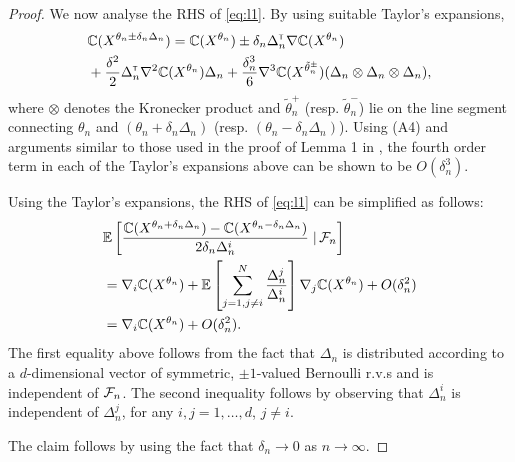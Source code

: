 \begin{proof}
We now analyse the RHS of \eqref{eq:l1}.
By using suitable Taylor's expansions,
\begin{align*}
&\mathbb{C}(X^{\theta_n \pm \delta_n \Delta_n}) = \mathbb{C}(X^{\theta_n}) \pm \delta_n \Delta_n^\mathsf{\scriptscriptstyle T} \nabla \mathbb{C}(X^{\theta_n}) \\
&+ \frac{\delta^2}{2} \Delta_n^\mathsf{\scriptscriptstyle T} \nabla^2 \mathbb{C}(X^{\theta_n})\Delta_n +  \frac{\delta_n^3}{6} \nabla^3 \mathbb{C}(X^{\tilde\theta^{\pm}_n})(\Delta_n \otimes \Delta_n \otimes \Delta_n),
\end{align*}
where $\otimes$ denotes the Kronecker product and $\tilde \theta_n^+$ (resp. $\tilde \theta_n^-$) lie on the line segment connecting $\theta_n$ and $(\theta_n + \delta_n \Delta_n)$ (resp. $(\theta_n - \delta_n \Delta_n)$). Using (A4) and arguments similar to those used in the proof of Lemma 1 in \cite{spall}, the fourth order term in each of the Taylor's expansions above can be shown to be $O(\delta_n^3)$.  

Using the Taylor's expansions,  the RHS of \eqref{eq:l1} can be simplified as follows:
\begin{align}
&\mathbb{E}\left[\dfrac{\mathbb{C}(X^{\theta_n + \delta_n \Delta_n}) - \mathbb{C}(X^{\theta_n - \delta_n \Delta_n})}{2 \delta_n \Delta_n^i} \left.\right| \mathcal{F}_n\right] \nonumber\\
&= \nabla_i \mathbb{C}(X^{\theta_n}) + \mathbb{E}\left[\sum_{j=1,j\not=i}^{N} \frac{\Delta_n^j}{\Delta_n^i}\right]\nabla_j \mathbb{C}(X^{\theta_n}) + O(\delta_n^2)\nonumber\\
&=  \nabla_i \mathbb{C}(X^{\theta_n}) + O(\delta_n^2).\label{eq:l2}
\end{align}
The first equality above follows from the fact that $\Delta_n$ is distributed according to a $d$-dimensional vector of symmetric, $\pm 1$-valued Bernoulli r.v.s and is independent of $\mathcal{F}_n$. The second inequality follows by observing that $\Delta_n^i$ is independent of $\Delta_n^j$, for any $i,j =1,\ldots,d$, $j\ne i$. 

The claim follows by using the fact that $\delta_n \rightarrow 0$ as $n\rightarrow \infty$.
\end{proof}

